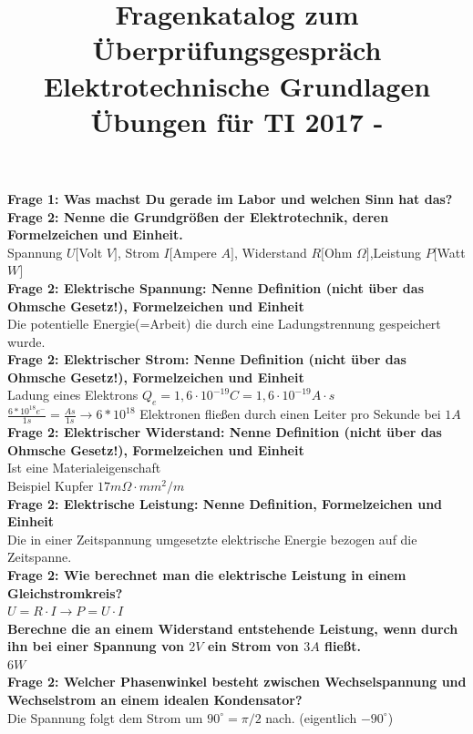 \documentclass[11pt,a4paper]{scrartcl}
\title{\textbf{Fragenkatalog zum Überprüfungsgespräch Elektrotechnische Grundlagen Übungen für TI 2017 - \UE}}
\begin{document}
\maketitle

\textbf{Frage 1: Was machst Du gerade im Labor und welchen Sinn hat das?}\\
\textbf{Frage 2: Nenne die Grundgrößen der Elektrotechnik, deren Formelzeichen und Einheit.}\\
Spannung $U[$Volt $V]$, Strom $I[$Ampere $A]$, Widerstand $R[$Ohm $\Omega]$,Leistung $P[$Watt $W]$\\
\textbf{Frage 2: Elektrische Spannung: Nenne Definition (nicht über das Ohmsche Gesetz!), Formelzeichen und Einheit}\\
Die potentielle Energie(=Arbeit) die durch eine Ladungstrennung gespeichert wurde.\\
\textbf{Frage 2: Elektrischer Strom: Nenne Definition (nicht über das Ohmsche Gesetz!), Formelzeichen und Einheit}\\
Ladung eines Elektrons $Q_e=1,6 \cdot 10^{-19}C=1,6 \cdot 10^{-19}A\cdot s$\\
$\frac{6*10^{18}e^-}{1s}=\frac{As}{1s} \rightarrow 6*10^{18}$ Elektronen fließen durch einen Leiter pro Sekunde bei $1A$\\
\textbf{Frage 2: Elektrischer Widerstand: Nenne Definition (nicht über das Ohmsche Gesetz!), Formelzeichen und Einheit}\\
Ist eine Materialeigenschaft\\
Beispiel Kupfer $17m\Omega \cdot mm^2/m$\\
\textbf{Frage 2: Elektrische Leistung: Nenne Definition, Formelzeichen und Einheit}\\
Die in einer Zeitspannung umgesetzte elektrische Energie bezogen auf die Zeitspanne.\\
\textbf{Frage 2: Wie berechnet man die elektrische Leistung in einem Gleichstromkreis?}\\
$U=R \cdot I \rightarrow P=U \cdot I$\\
\textbf{Berechne die an einem Widerstand entstehende Leistung, wenn durch ihn bei einer Spannung von $2V$ ein Strom von $3A$ fließt.}\\
$6W$\\
\textbf{Frage 2: Welcher Phasenwinkel besteht zwischen Wechselspannung und Wechselstrom an einem idealen Kondensator?}\\
Die Spannung folgt dem Strom um $90^\circ=\pi/2$ nach. (eigentlich $-90^\circ$)\\
\end{document}
